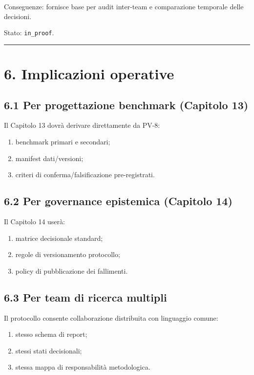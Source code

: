 Conseguenze:
fornisce base per audit inter-team e comparazione temporale delle decisioni.

Stato: \texttt{in\_proof}.

\begin{center}\rule{0.5\linewidth}{0.5pt}\end{center}

\section{6. Implicazioni operative}

\subsection{6.1 Per progettazione benchmark (Capitolo 13)}

Il Capitolo 13 dovrà derivare direttamente da PV-8:

\begin{enumerate}
\def\labelenumi{\arabic{enumi}.}
\tightlist
\item
  benchmark primari e secondari;
\item
  manifest dati/versioni;
\item
  criteri di conferma/falsificazione pre-registrati.
\end{enumerate}

\subsection{6.2 Per governance epistemica (Capitolo 14)}

Il Capitolo 14 userà:

\begin{enumerate}
\def\labelenumi{\arabic{enumi}.}
\tightlist
\item
  matrice decisionale standard;
\item
  regole di versionamento protocollo;
\item
  policy di pubblicazione dei fallimenti.
\end{enumerate}

\subsection{6.3 Per team di ricerca multipli}

Il protocollo consente collaborazione distribuita con linguaggio comune:

\begin{enumerate}
\def\labelenumi{\arabic{enumi}.}
\tightlist
\item
  stesso schema di report;
\item
  stessi stati decisionali;
\item
  stessa mappa di responsabilità metodologica.
\end{enumerate}

